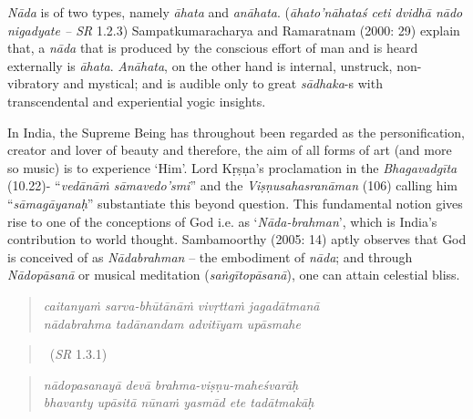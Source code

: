 \textit{Nāda} is of two types, namely \textit{āhata} and \textit{anāhata}. (\textit{āhato’nāhataś ceti dvidhā nādo nigadyate – SR} 1.2.3) Sampatkumaracharya and Ramaratnam (2000: 29) explain that, a \textit{nāda} that is produced by the conscious effort of man and is heard externally is \textit{āhata}. \textit{Anāhata}, on the other hand is internal, unstruck, non-vibratory and mystical; and is audible only to great \textit{sādhaka}-s with transcendental and experiential yogic insights.

In India, the Supreme Being has throughout been regarded as the personification, creator and lover of beauty and therefore, the aim of all forms of art (and more so music) is to experience ‘Him’. Lord Kṛṣṇa’s proclamation in the \textit{Bhagavadgīta} (10.22)- “\textit{vedānāṁ sāmavedo’smi}” and the \textit{Viṣṇusahasranāman} (106) calling him “\textit{sāmagāyanaḥ}” substantiate this beyond question. This fundamental notion gives rise to one of the conceptions of God i.e. as ‘\textit{Nāda-brahman}’, which is India’s contribution to world thought. Sambamoorthy (2005: 14) aptly observes that God is conceived of as \textit{Nādabrahman} – the embodiment of \textit{nāda}; and through \textit{Nādopāsanā} or musical meditation (\textit{saṅgītopāsanā}), one can attain celestial bliss.

\begin{verse}
\textit{caitanyaṁ sarva-bhūtānāṁ vivṛttaṁ jagadātmanā} \\ \textit{nādabrahma tadānandam advitīyam upāsmahe }
\end{verse}

\vspace{-.5cm}

\begin{verse}

~\hfill (\textit{SR} 1.3.1)
\end{verse}

\begin{verse}
\textit{nādopasanayā devā brahma-viṣṇu-maheśvarāḥ }\\ \textit{bhavanty upāsitā nūnaṁ yasmād ete tadātmakāḥ }
\end{verse}

